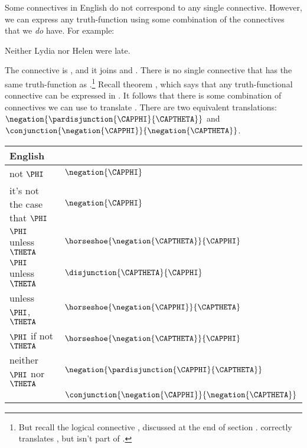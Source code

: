 \begin{majorILnc}{}
	Some connectives in English do not correspond to any single \GSL{} connective.
	However, we can express any truth-function using some combination of the \GSL{} connectives that we \emph{do} have.
	For example: 
	\begin{menumerate}
		\item\label{GSLTransSentenceU} Neither Lydia nor Helen were late.
	\end{menumerate} 
	The connective is , and it joins  and . 
	There is no single \GSL{} connective that has the same truth-function as .\footnote{%
		But recall the logical connective , discussed at the end of section . 
		 correctly translates , but isn't part of \GSL{}. 
	} 
	Recall theorem , which says that any truth-functional connective can be expressed in \GSL{}. 
	It follows that there is some combination of \GSL{} connectives we can use to translate .
	There are two equivalent translations: $\negation{\pardisjunction{\CAPPHI}{\CAPTHETA}}$ and $\conjunction{\negation{\CAPPHI}}{\negation{\CAPTHETA}}$.
	\begin{table}
		\renewcommand{\arraystretch}{1.5}%
		\begin{center}
			\begin{tabular}{ l l } %
				\toprule
				\textbf{English} & \textbf{\GSL{}} \\ 
				\midrule
				not $\PHI$ & $\negation{\CAPPHI}$ \\
				it's not the case that $\PHI$ & $\negation{\CAPPHI}$ \\
				$\PHI$ unless $\THETA$ & $\horseshoe{\negation{\CAPTHETA}}{\CAPPHI}$ \\
				$\PHI$ unless $\THETA$ & $\disjunction{\CAPTHETA}{\CAPPHI}$ \\
				unless $\PHI$, $\THETA$ & $\horseshoe{\negation{\CAPPHI}}{\CAPTHETA}$ \\
				$\PHI$ if not $\THETA$ & $\horseshoe{\negation{\CAPTHETA}}{\CAPPHI}$ \\
				neither $\PHI$ nor $\THETA$ & $\negation{\pardisjunction{\CAPPHI}{\CAPTHETA}}$ \\
				& $\conjunction{\negation{\CAPPHI}}{\negation{\CAPTHETA}}$ \\

\end{tabular}
\end{center}
\end{table}
\end{majorILnc}
